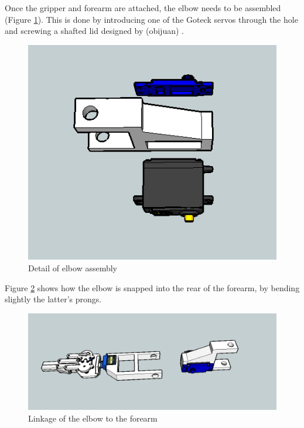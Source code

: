 Once the gripper and forearm are attached, the elbow needs to be assembled (Figure \ref{ass5}). This is done by introducing one of the Goteck servos through the hole and screwing a shafted lid designed by (obijuan) .\\






	\begin{figure}[H]
			\centering
			\includegraphics[scale=0.5]{images/Assembly/5.png}
			\caption{Detail of elbow assembly}
			\label{ass5}
	\end{figure}
	\bigskip






Figure \ref{ass7} shows how the elbow is snapped into the rear of the forearm, by bending slightly the latter's prongs.\\

	\begin{figure}[H]
			\centering
			\includegraphics[scale=0.5]{images/Assembly/7.png}
			\caption{Linkage of the elbow to the forearm }
			\label{ass7}
	\end{figure}
	\bigskip





